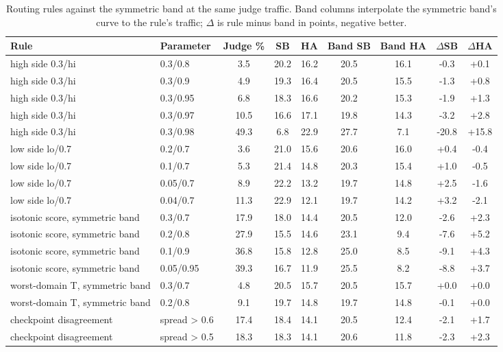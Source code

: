 \documentclass[journal]{IEEEtran}
\begin{document}
\setcounter{table}{11}
\begin{table}[!htbp]
\caption{Routing rules against the symmetric band at the same judge traffic. Band columns interpolate the symmetric band's curve to the rule's traffic; $\Delta$ is rule minus band in points, negative better.}
\label{abr:tab:routealt}
\centering
\scriptsize
\setlength{\tabcolsep}{3pt}
\begin{tabular}{@{}llccccccc@{}}
\toprule
Rule & Parameter & Judge \% & SB & HA & Band SB & Band HA & $\Delta$SB & $\Delta$HA \\
\midrule
high side 0.3/hi & 0.3/0.8 & 3.5 & 20.2 & 16.2 & 20.5 & 16.1 & -0.3 & +0.1 \\
high side 0.3/hi & 0.3/0.9 & 4.9 & 19.3 & 16.4 & 20.5 & 15.5 & -1.3 & +0.8 \\
high side 0.3/hi & 0.3/0.95 & 6.8 & 18.3 & 16.6 & 20.2 & 15.3 & -1.9 & +1.3 \\
high side 0.3/hi & 0.3/0.97 & 10.5 & 16.6 & 17.1 & 19.8 & 14.3 & -3.2 & +2.8 \\
high side 0.3/hi & 0.3/0.98 & 49.3 & 6.8 & 22.9 & 27.7 & 7.1 & -20.8 & +15.8 \\
low side lo/0.7 & 0.2/0.7 & 3.6 & 21.0 & 15.6 & 20.6 & 16.0 & +0.4 & -0.4 \\
low side lo/0.7 & 0.1/0.7 & 5.3 & 21.4 & 14.8 & 20.3 & 15.4 & +1.0 & -0.5 \\
low side lo/0.7 & 0.05/0.7 & 8.9 & 22.2 & 13.2 & 19.7 & 14.8 & +2.5 & -1.6 \\
low side lo/0.7 & 0.04/0.7 & 11.3 & 22.9 & 12.1 & 19.7 & 14.2 & +3.2 & -2.1 \\
isotonic score, symmetric band & 0.3/0.7 & 17.9 & 18.0 & 14.4 & 20.5 & 12.0 & -2.6 & +2.3 \\
isotonic score, symmetric band & 0.2/0.8 & 27.9 & 15.5 & 14.6 & 23.1 & 9.4 & -7.6 & +5.2 \\
isotonic score, symmetric band & 0.1/0.9 & 36.8 & 15.8 & 12.8 & 25.0 & 8.5 & -9.1 & +4.3 \\
isotonic score, symmetric band & 0.05/0.95 & 39.3 & 16.7 & 11.9 & 25.5 & 8.2 & -8.8 & +3.7 \\
worst-domain T, symmetric band & 0.3/0.7 & 4.8 & 20.5 & 15.7 & 20.5 & 15.7 & +0.0 & +0.0 \\
worst-domain T, symmetric band & 0.2/0.8 & 9.1 & 19.7 & 14.8 & 19.7 & 14.8 & -0.1 & +0.0 \\
checkpoint disagreement & spread > 0.6 & 17.4 & 18.4 & 14.1 & 20.5 & 12.4 & -2.1 & +1.7 \\
checkpoint disagreement & spread > 0.5 & 18.3 & 18.3 & 14.1 & 20.6 & 11.8 & -2.3 & +2.3 \\

\end{tabular}
\end{table}
\end{document}
